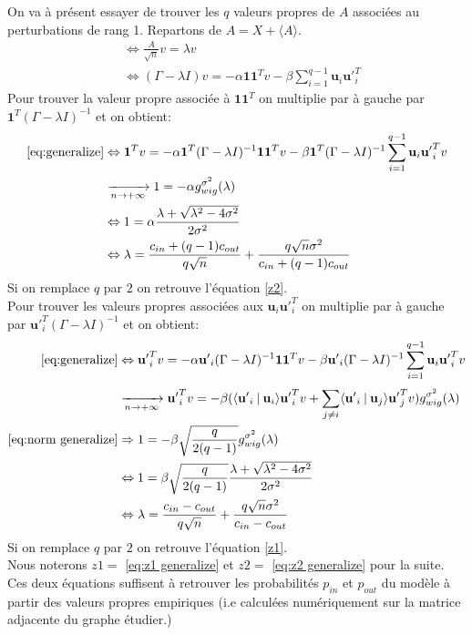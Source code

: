 On va à présent essayer de trouver les $q$ valeurs propres de $A$ associées au perturbations de rang 1. 
Repartons de $A = X + \langle A \rangle$.
\begin{align}
&\Leftrightarrow \frac{A}{\sqrt{n}}v =\lambda v \nonumber \\
&\Leftrightarrow (\Gamma - \lambda I)v =-\alpha \mathbf{11}^Tv - \beta \sum_{i=1}^{q-1}\mathbf{u}_i\mathbf{u'}_i^T \label{eq:generalize}
\end{align}
Pour trouver la valeur propre associée à $\mathbf{11}^T$ on multiplie par à gauche par $\mathbf{1}^T(\Gamma -\lambda I)^{-1}$ et on obtient:
\begin{align}
\eqref{eq:generalize} &\Leftrightarrow \mathbf{1}^Tv =-\alpha \mathbf{1}^T(\Gamma -\lambda I)^{-1}\mathbf{11}^Tv - \beta \mathbf{1}^T(\Gamma -\lambda I)^{-1}\sum_{i=1}^{q-1}\mathbf{u}_i\mathbf{u'}_i^Tv \nonumber\\
&\xrightarrow[n \to +\infty]{} 1 = -\alpha g_{wig}^{\sigma^2}(\lambda) \nonumber\\
&\Leftrightarrow 1 = \alpha \frac{\lambda + \sqrt{\lambda^2 - 4\sigma^2}}{2\sigma^2} \nonumber\\
&\Leftrightarrow \lambda = \frac{c_{in} + (q-1)c_{out}}{q\sqrt{n}} + \frac{q\sqrt{n}\sigma^2}{c_{in} + (q-1)c_{out}} \label{eq:z2 generalize}
\end{align}
Si on remplace $q$ par $2$ on retrouve l'équation \eqref{z2}.\\
Pour trouver les valeurs propres associées aux $\mathbf{u}_i\mathbf{u'}_i^T$ on multiplie par à gauche par $\mathbf{u'}_i^T(\Gamma -\lambda I)^{-1}$ et on obtient:
\begin{align}
\eqref{eq:generalize} &\Leftrightarrow \mathbf{u'}_i^Tv =-\alpha \mathbf{u'}_i(\Gamma -\lambda I)^{-1}\mathbf{11}^Tv - \beta \mathbf{u'}_i(\Gamma -\lambda I)^{-1}\sum_{i=1}^{q-1}\mathbf{u}_i\mathbf{u'}_i^Tv \nonumber\\
&\xrightarrow[n \to +\infty]{} \mathbf{u'}_i^Tv = -\beta(\langle \mathbf{u'}_i\:|\: \mathbf{u}_i \rangle\mathbf{u'}_i^Tv + \sum_{j \neq i}^{} \langle \mathbf{u'}_i\:|\: \mathbf{u}_j \rangle\mathbf{u'}_j^Tv)g_{wig}^{\sigma^2}(\lambda) \nonumber\\
\eqref{eq:norm generalize} &\Rightarrow 1 = -\beta  \sqrt{\frac{q}{2(q-1)}} g_{wig}^{\sigma^2}(\lambda) \nonumber\\
&\Leftrightarrow 1 = \beta \sqrt{\frac{q}{2(q-1)}} \frac{\lambda + \sqrt{\lambda^2 - 4\sigma^2}}{2\sigma^2} \nonumber\\
&\Leftrightarrow \lambda = \frac{c_{in} - c_{out}}{q\sqrt{n}} + \frac{q\sqrt{n}\sigma^2}{c_{in} - c_{out}}\label{eq:z1 generalize}
\end{align}
Si on remplace $q$ par $2$ on retrouve l'équation \eqref{z1}.\\
Nous noterons $z1 =$ \eqref{eq:z1 generalize}  et $z2 =$ \eqref{eq:z2 generalize} pour la suite.
Ces deux équations suffisent à retrouver les probabilités $p_{in}$ et $p_{out}$ du modèle à partir des valeurs propres empiriques (i.e calculées numériquement sur la matrice adjacente du graphe étudier.)\\


